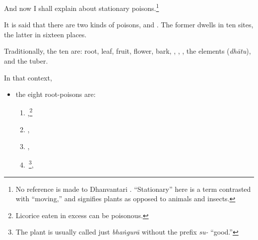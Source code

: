 \begin{translation}
    
    \item[1]
    And now I shall explain  about stationary 
    poisons.\footnote{No reference is made to Dhanvantari 
    \citep[see][]{birc-2021}. “Stationary” here is a term contrasted with “moving,” 
    and signifies plants as opposed to animals and insects.}
  
    \item[3]
    \noindent It is said that there are two kinds of poisons,
     and . The former
    dwells in ten sites, the latter in sixteen places.
   
    \item[4]
    Traditionally, the ten are: root, leaf, fruit, flower, bark,
    , , , the
    elements (\emph{dhātu}), and the tuber.

    \item[5]
    
    In that context,\label{poisonousplants}
    \begin{itemize}
        \item
        the eight root-poisons are:
        \begin{enumerate}
        \item {},\footnote{Licorice eaten in excess can be poisonous.}
       
        \item {},
    
        \item {},
        
        \item {}\,\footnote{The plant is 
        usually called just \emph{bhaṅgurā} without the prefix \emph{su-} “good.”},
        

\end{enumerate}
\end{itemize}
\end{translation}
